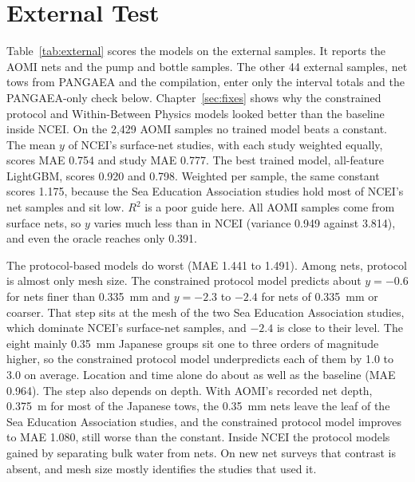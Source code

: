 \documentclass[12pt,a4paper]{report}
\newcommand{\Rsq}{$R^2$}
\begin{document}
\section{External Test}
\label{sec:external}

Table~\ref{tab:external} scores the models on the external samples. It reports the AOMI nets and the pump and bottle samples. The other 44 external samples, net tows from PANGAEA and the compilation, enter only the interval totals and the PANGAEA-only check below. Chapter~\ref{sec:fixes} shows why the constrained protocol and Within-Between Physics models looked better than the baseline inside NCEI. On the 2,429 AOMI samples no trained model beats a constant. The mean $y$ of NCEI's surface-net studies, with each study weighted equally, scores MAE 0.754 and study MAE 0.777. The best trained model, all-feature LightGBM, scores 0.920 and 0.798. Weighted per sample, the same constant scores 1.175, because the Sea Education Association studies hold most of NCEI's net samples and sit low. \Rsq{} is a poor guide here. All AOMI samples come from surface nets, so $y$ varies much less than in NCEI (variance 0.949 against 3.814), and even the oracle reaches only 0.391.

The protocol-based models do worst (MAE 1.441 to 1.491). Among nets, protocol is almost only mesh size. The constrained protocol model predicts about $y=-0.6$ for nets finer than 0.335~mm and $y=-2.3$ to $-2.4$ for nets of 0.335~mm or coarser. That step sits at the mesh of the two Sea Education Association studies, which dominate NCEI's surface-net samples, and $-2.4$ is close to their level. The eight mainly 0.35~mm Japanese groups sit one to three orders of magnitude higher, so the constrained protocol model underpredicts each of them by 1.0 to 3.0 on average. Location and time alone do about as well as the baseline (MAE 0.964). The step also depends on depth. With AOMI's recorded net depth, 0.375~m for most of the Japanese tows, the 0.35~mm nets leave the leaf of the Sea Education Association studies, and the constrained protocol model improves to MAE 1.080, still worse than the constant. Inside NCEI the protocol models gained by separating bulk water from nets. On new net surveys that contrast is absent, and mesh size mostly identifies the studies that used it.
\end{document}
